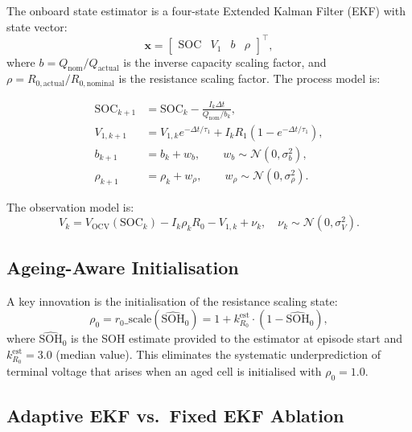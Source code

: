 The onboard state estimator is a four-state Extended Kalman Filter
(EKF) with state vector:
\begin{equation}
  \mathbf{x} = \begin{bmatrix} \mathrm{SOC} & V_1 & b & \rho
  \end{bmatrix}^\top,
\end{equation}
where $b = Q_{\mathrm{nom}} / Q_{\mathrm{actual}}$ is the inverse
capacity scaling factor, and $\rho = R_{0,\mathrm{actual}} /
R_{0,\mathrm{nominal}}$ is the resistance scaling factor.  The
process model is:

\begin{align}
  \mathrm{SOC}_{k+1} &= \mathrm{SOC}_k - \frac{I_k \Delta t}
    {Q_{\mathrm{nom}} / b_k}, \\
  V_{1,k+1} &= V_{1,k} e^{-\Delta t/\tau_1}
    + I_k R_1 (1 - e^{-\Delta t/\tau_1}), \\
  b_{k+1} &= b_k + w_b, \qquad w_b \sim \mathcal{N}(0, \sigma_b^2), \\
  \rho_{k+1} &= \rho_k + w_\rho, \qquad
    w_\rho \sim \mathcal{N}(0, \sigma_\rho^2).
\end{align}

The observation model is:
\begin{equation}
  V_{k} = V_{\mathrm{OCV}}(\mathrm{SOC}_k)
  - I_k \rho_k R_0 - V_{1,k} + \nu_k,
  \quad \nu_k \sim \mathcal{N}(0, \sigma_V^2).
\end{equation}

\subsection{Ageing-Aware Initialisation}

A key innovation is the initialisation of the resistance scaling state:
\begin{equation}
  \rho_0 = r_0\text{\_scale}(\widehat{\mathrm{SOH}}_0)
  = 1 + k_{R_0}^{\mathrm{est}} \cdot (1 - \widehat{\mathrm{SOH}}_0),
\end{equation}
where $\widehat{\mathrm{SOH}}_0$ is the SOH estimate provided to
the estimator at episode start and $k_{R_0}^{\mathrm{est}} = 3.0$
(median value).  This eliminates the systematic underprediction of
terminal voltage that arises when an aged cell is initialised with
$\rho_0 = 1.0$.

\subsection{Adaptive EKF vs.\ Fixed EKF Ablation}

